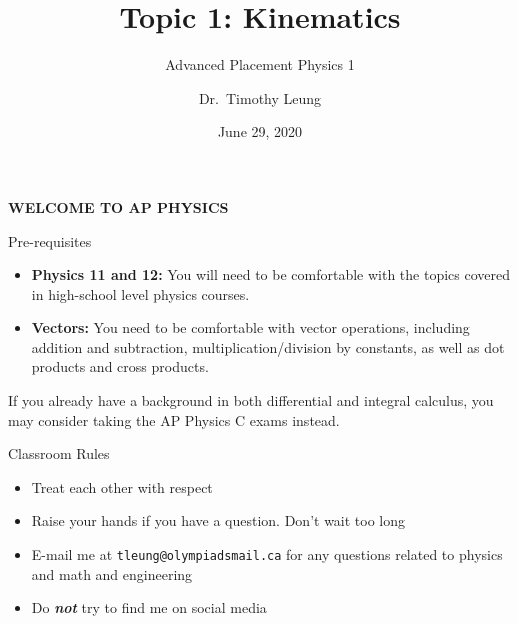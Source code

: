 \documentclass[12pt,compress,aspectratio=169]{beamer}
\title{Topic 1: Kinematics}
\subtitle{Advanced Placement Physics 1}
\author[TML]{Dr.\ Timothy Leung}
\institute{Olympiads School}
\date{June 29, 2020}
\begin{document}
\begin{frame}{}

  {\LARGE
    \begin{center}
      \textbf{WELCOME TO AP PHYSICS}
    \end{center}
  }
\end{frame}



\begin{frame}{Pre-requisites}
  \begin{itemize}
  \item\textbf{Physics 11 and 12:} You will need to be comfortable with the
    topics covered in high-school level physics courses.
  \item\textbf{Vectors:} You need to be comfortable with vector operations,
    including addition and subtraction, multiplication/division by constants,
    as well as dot products and cross products.
  \end{itemize}
  If you already have a background in both differential and integral calculus,
  you may consider taking the AP Physics C exams instead.
\end{frame}






\begin{frame}{Classroom Rules}
  \begin{itemize}
  \item Treat each other with respect
  \item Raise your hands if you have a question. Don't wait too long
  \item E-mail me at \texttt{tleung@olympiadsmail.ca} for any questions related
    to physics and math and engineering
  \item Do \textbf{\emph{not}} try to find me on social media
  \end{itemize}
\end{frame}
\end{document}
